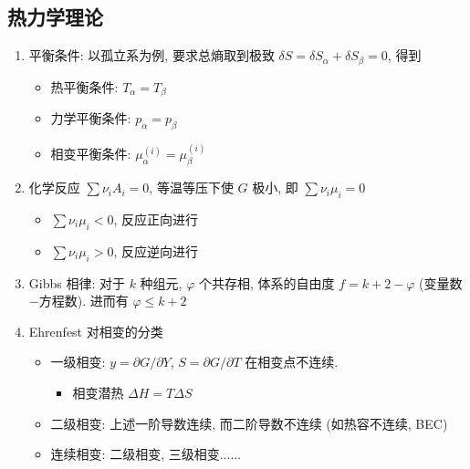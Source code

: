 \documentclass[12pt,a4paper]{article}%
\numberwithin{equation}{section}
\begin{document}
\subsection{热力学理论} %
\label{sub:phase_tra_thermo}
\begin{enumerate}
    \item 平衡条件: 以孤立系为例, 要求总熵取到极致 $\delta S = \delta S_\alpha + \delta S_\beta = 0$, 得到
    \begin{itemize}
        \item 热平衡条件: $T_\alpha = T_\beta$
        \item 力学平衡条件: $p_\alpha = p_\beta$
        \item 相变平衡条件: $\mu^{(i)}_\alpha = \mu^{(i)}_\beta$
    \end{itemize}
    \item 化学反应 $\sum \nu_i A_i = 0$, 
    等温等压下使 $G$ 极小, 即 $\sum \nu_i\mu_i = 0$
    \begin{itemize}
        \item $\sum \nu_i\mu_i <0$, 反应正向进行
        \item $\sum \nu_i\mu_i >0$, 反应逆向进行
    \end{itemize}
    \item Gibbs 相律: 对于 $k$ 种组元, $\varphi$ 个共存相, 体系的自由度 $f = k+2-\varphi$ (变量数$-$方程数). 进而有 $\varphi\le k+2$
    \item Ehrenfest 对相变的分类
    \begin{itemize}
        \item 一级相变: $y = \partial G/\partial Y$, $S = \partial G/\partial T$ 在相变点不连续. 
        \begin{itemize}
            \item 相变潜热 $\Delta H = T\Delta S$
        \end{itemize}
        \item 二级相变: 上述一阶导数连续, 而二阶导数不连续 (如热容不连续, BEC)
        \item 连续相变: 二级相变, 三级相变......
    \end{itemize}
\end{enumerate}
\end{document}
